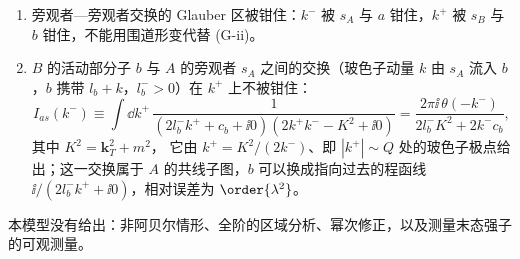 \begin{proposition}
\begin{enumerate}[label=(G-\roman*),leftmargin=3em,itemsep=1pt,topsep=2pt]
\item 旁观者—旁观者交换的 Glauber 区被钳住：$k^-$ 被 $s_A$ 与 $a$ 钳住，$k^+$ 被 $s_B$ 与 $b$ 钳住，不能用围道形变代替 (G-ii)。
\item $B$ 的活动部分子 $b$ 与 $A$ 的旁观者 $s_A$ 之间的交换（玻色子动量 $k$ 由 $s_A$ 流入 $b$，$b$ 携带 $l_b+k$，$l_b^->0$）在 $k^+$ 上不被钳住：
\begin{equation}\label{eq:dy-Ias}
I_{as}(k^-)\equiv\int\dd k^+\,\frac{1}{(2l_b^-k^++c_b+\ii0)(2k^+k^--K^2+\ii0)}=\frac{2\pi\ii\,\theta(-k^-)}{2l_b^-K^2+2k^-c_b},
\end{equation}
其中 $K^2=\mathbf k_T^2+m^2$，
它由 $k^+=K^2/(2k^-)$、即 $|k^+|\sim Q$ 处的玻色子极点给出；这一交换属于 $A$ 的共线子图，$b$ 可以换成指向过去的程函线 $\ii/(2l_b^-k^++\ii0)$，相对误差为 $\order{\lambda^2}$。
\end{enumerate}
本模型没有给出：非阿贝尔情形、全阶的区域分析、幂次修正，以及测量末态强子的可观测量。
\end{proposition}

